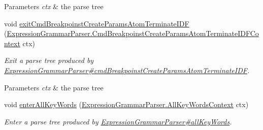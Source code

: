 \begin{DoxyCompactItemize}
\begin{DoxyCompactList}
\begin{DoxyParams}{Parameters}
{\em ctx} & the parse tree\\
\hline
\end{DoxyParams}
 \end{DoxyCompactList}\item 
void \hyperlink{classgov_1_1nasa_1_1jpf_1_1inspector_1_1server_1_1expression_1_1parser_1_1_expression_grammar_base_listener_a3751e540319426d2bbffe847e7d61ee5}{exit\+Cmd\+Breakpoinst\+Create\+Params\+Atom\+Terminate\+I\+DF} (\hyperlink{classgov_1_1nasa_1_1jpf_1_1inspector_1_1server_1_1expression_1_1parser_1_1_expression_grammar_pa33db42909734e187834b73b54c5beb59}{Expression\+Grammar\+Parser.\+Cmd\+Breakpoinst\+Create\+Params\+Atom\+Terminate\+I\+D\+F\+Context} ctx)
\begin{DoxyCompactList}\small\item\em Exit a parse tree produced by \hyperlink{classgov_1_1nasa_1_1jpf_1_1inspector_1_1server_1_1expression_1_1parser_1_1_expression_grammar_parser_a67979d89277e44ddae7fa8ab4a4d8cfb}{Expression\+Grammar\+Parser\#cmd\+Breakpoinst\+Create\+Params\+Atom\+Terminate\+I\+DF}.


\begin{DoxyParams}{Parameters}
{\em ctx} & the parse tree\\
\hline
\end{DoxyParams}
 \end{DoxyCompactList}\item 
void \hyperlink{classgov_1_1nasa_1_1jpf_1_1inspector_1_1server_1_1expression_1_1parser_1_1_expression_grammar_base_listener_a26dc6096d85f5dc5eaf55e9ef74e857f}{enter\+All\+Key\+Words} (\hyperlink{classgov_1_1nasa_1_1jpf_1_1inspector_1_1server_1_1expression_1_1parser_1_1_expression_grammar_parser_1_1_all_key_words_context}{Expression\+Grammar\+Parser.\+All\+Key\+Words\+Context} ctx)
\begin{DoxyCompactList}\small\item\em Enter a parse tree produced by \hyperlink{classgov_1_1nasa_1_1jpf_1_1inspector_1_1server_1_1expression_1_1parser_1_1_expression_grammar_parser_a69f20b32ba4350fe916222aa4987d304}{Expression\+Grammar\+Parser\#all\+Key\+Words}.



\end{DoxyCompactList}
\end{DoxyCompactItemize}
